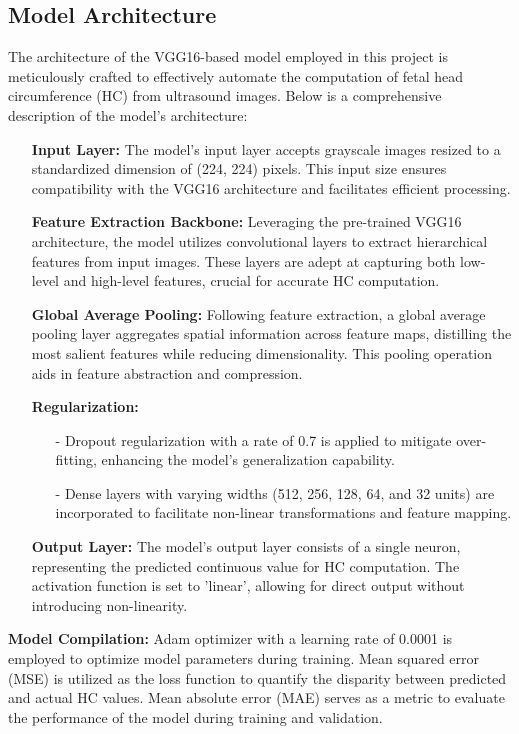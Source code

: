 \documentclass[conference]{IEEEtran}
\begin{document}
\subsection{\textbf{Model Architecture}}
The architecture of the VGG16-based model employed in this project is meticulously crafted to effectively automate the computation of fetal head circumference (HC) from ultrasound images. Below is a comprehensive description of the model's architecture:
\begin{itemize}
    \item[] \textbf{Input Layer:} 
    The model's input layer accepts grayscale images resized to a standardized dimension of (224, 224) pixels. This input size ensures compatibility with the VGG16 architecture and facilitates efficient processing.
    \item[] \textbf{Feature Extraction Backbone:} 
    Leveraging the pre-trained VGG16 architecture, the model utilizes convolutional layers to extract hierarchical features from input images. These layers are adept at capturing both low-level and high-level features, crucial for accurate HC computation.
    \item[] \textbf{Global Average Pooling:} 
    Following feature extraction, a global average pooling layer aggregates spatial information across feature maps, distilling the most salient features while reducing dimensionality. This pooling operation aids in feature abstraction and compression.
    \item[] \textbf{Regularization:}
    \begin{itemize}
        \item[-] Dropout regularization with a rate of 0.7 is applied to mitigate over-fitting, enhancing the model's generalization capability.
        \item[-] Dense layers with varying widths (512, 256, 128, 64, and 32 units) are incorporated to facilitate non-linear transformations and feature mapping.
    \end{itemize}
    \item[] \textbf{Output Layer:} The model's output layer consists of a single neuron, representing the predicted continuous value for HC computation. The activation function is set to 'linear', allowing for direct output without introducing non-linearity.
\end{itemize}

\textbf{Model Compilation:} Adam optimizer with a learning rate of 0.0001 is employed to optimize model parameters during training.
Mean squared error (MSE) is utilized as the loss function to quantify the disparity between predicted and actual HC values.
Mean absolute error (MAE) serves as a metric to evaluate the performance of the model during training and validation. 
\end{document}
